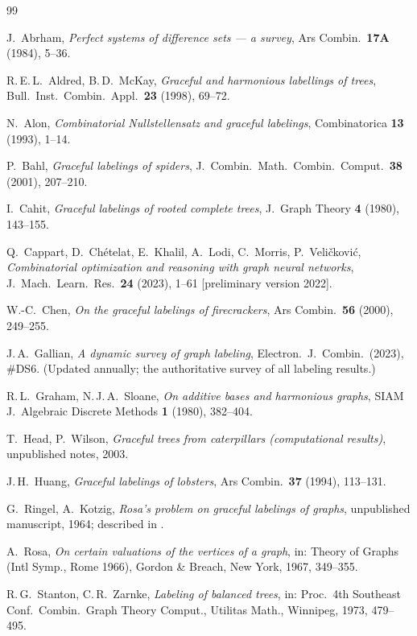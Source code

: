 \documentclass[12pt,a4paper]{amsart}
\theoremstyle{definition}
\theoremstyle{remark}
\begin{document}
\begin{thebibliography}{99}

J.~Abrham,
\textit{Perfect systems of difference sets --- a survey},
Ars Combin.\ \textbf{17A} (1984), 5--36.

R.\,E.\,L.~Aldred, B.\,D.~McKay,
\textit{Graceful and harmonious labellings of trees},
Bull.\ Inst.\ Combin.\ Appl.\ \textbf{23} (1998), 69--72.

N.~Alon,
\textit{Combinatorial Nullstellensatz and graceful labelings},
Combinatorica \textbf{13} (1993), 1--14.

P.~Bahl,
\textit{Graceful labelings of spiders},
J.\ Combin.\ Math.\ Combin.\ Comput.\ \textbf{38} (2001), 207--210.

I.~Cahit,
\textit{Graceful labelings of rooted complete trees},
J.\ Graph Theory \textbf{4} (1980), 143--155.

Q.~Cappart, D.~Chételat, E.~Khalil, A.~Lodi, C.~Morris, P.~Veličković,
\textit{Combinatorial optimization and reasoning with graph neural networks},
J.\ Mach.\ Learn.\ Res.\ \textbf{24} (2023), 1--61 [preliminary version 2022].

W.-C.~Chen,
\textit{On the graceful labelings of firecrackers},
Ars Combin.\ \textbf{56} (2000), 249--255.

J.\,A.~Gallian,
\textit{A dynamic survey of graph labeling},
Electron.\ J.\ Combin.\ (2023), \#DS6.
(Updated annually; the authoritative survey of all labeling results.)

R.\,L.~Graham, N.\,J.\,A.~Sloane,
\textit{On additive bases and harmonious graphs},
SIAM J.\ Algebraic Discrete Methods \textbf{1} (1980), 382--404.

T.~Head, P.~Wilson,
\textit{Graceful trees from caterpillars (computational results)},
unpublished notes, 2003.

J.\,H.~Huang,
\textit{Graceful labelings of lobsters},
Ars Combin.\ \textbf{37} (1994), 113--131.

G.~Ringel, A.~Kotzig,
\textit{Rosa's problem on graceful labelings of graphs},
unpublished manuscript, 1964; described in \cite{Rosa1967}.

A.~Rosa,
\textit{On certain valuations of the vertices of a graph},
in: Theory of Graphs (Intl Symp., Rome 1966), Gordon \& Breach,
New York, 1967, 349--355.

R.\,G.~Stanton, C.\,R.~Zarnke,
\textit{Labeling of balanced trees},
in: Proc.\ 4th Southeast Conf.\ Combin.\ Graph Theory Comput.,
Utilitas Math., Winnipeg, 1973, 479--495.

\end{thebibliography}
\end{document}
